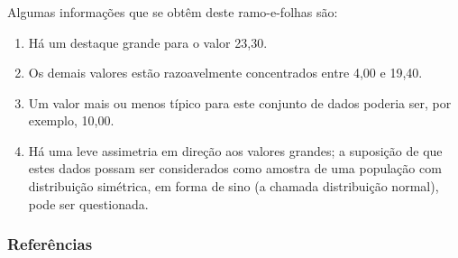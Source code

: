\documentclass[14pt,aspectratio=1610]{beamer}
\begin{document}
\begin{frame}{}
\frametitle{}
\begin{block}{}
\justifying
\begin{table}[H]
\caption{Diagrama de Ramos e Folhas dos Salários ($\times$ sal. Min)}
\end{table}
\end{block}
\end{frame}

\begin{frame}{}
\frametitle{}
\begin{block}{}
\justifying
Algumas informações que se obtêm deste ramo-e-folhas são:
\begin{enumerate}
\item Há um destaque grande para o valor 23,30.\pause
\item Os demais valores estão razoavelmente concentrados entre 4,00 e 19,40.\pause
\item Um valor mais ou menos típico para este conjunto de dados poderia ser, por 
exemplo, 10,00.\pause
\item Há uma leve assimetria em direção aos valores grandes; a suposição de que estes dados possam ser considerados como amostra de uma população com distribuição simétrica, em forma de sino (a chamada distribuição normal), pode ser questionada.
\end{enumerate}
\nocite{Apostila}
\end{block}
\end{frame}

\begin{frame}%
\frametitle{\bf Referências}
\printbibliography
\end{frame}
\end{document}
